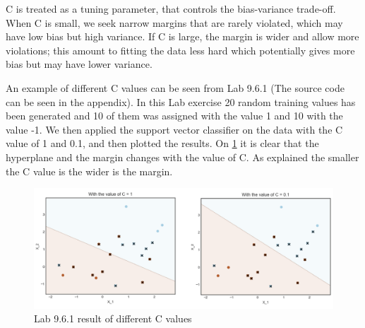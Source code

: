C is treated as a tuning parameter, that controls the bias-variance trade-off. When C is small, we seek narrow margins that are rarely violated, which may have low bias but high variance. If C is large, the margin is wider and allow more violations; this amount to fitting the data less hard which potentially gives more bias but may have lower variance. 

An example of different C values can be seen from Lab 9.6.1 (The source code can be seen in the appendix). In this Lab exercise 20 random training values has been generated and 10 of them was assigned with the value 1 and 10 with the value -1. We then applied the support vector classifier on the data with the C value of 1 and 0.1, and then plotted the results. On \cref{fig:SVC_C_values} it is clear that the hyperplane and the margin changes with the value of C. As explained the smaller the C value is the wider is the margin. 

\begin{figure}[H]
	\centering
	\includegraphics[width=\textwidth]{Img/SVC_C_values.PNG}
	\caption{Lab 9.6.1 result of different C values}
	\label{fig:SVC_C_values}
\end{figure} 
